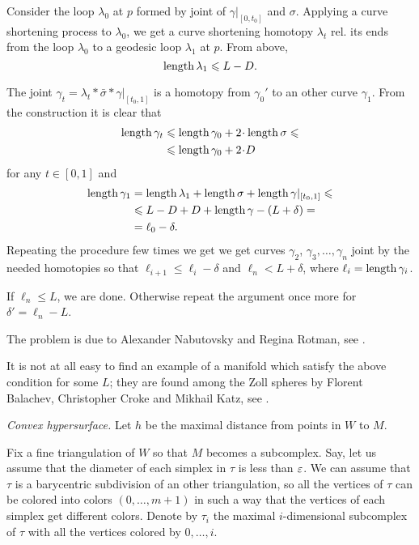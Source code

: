 Consider the loop $\lambda_0$ at $p$
formed by joint of $\gamma|_{[0,t_0]}$ and $\sigma$.
Applying a curve shortening process to $\lambda_0$, 
we get a curve shortening homotopy $\lambda_t$
rel. its ends 
from the loop $\lambda_0$ to a geodesic loop $\lambda_1$ at $p$.
From above, 
\[\operatorname{\rm length}\lambda_1\leqslant L-D.\]

The joint $\gamma_t=\lambda_t*\bar\sigma*\gamma|_{[t_0,1]}$
is a homotopy
from $\gamma_0'$ to an other curve $\gamma_1$.
From the construction it is clear that 
\begin{align*}
 \length \gamma_t&\le \length \gamma_0+2\cdot \length\sigma\le
 \\
 &\le \length \gamma_0+2\cdot D
\end{align*}
for any $t\in[0,1]$
and 
\begin{align*}
 \operatorname{\rm length} \gamma_1&=\operatorname{\rm length}\lambda_1+\operatorname{\rm length}\sigma+\operatorname{\rm length}\gamma|_{[t_0,1]}\leqslant
\\ &\leqslant L-D+D+\operatorname{\rm length}\gamma-(L+\delta)=
\\ &=\ell_0 -\delta.
\end{align*}
Repeating the procedure few times we get we get curves $\gamma_2$, $\gamma_3,\dots,\gamma_n$
joint by the needed homotopies so that 
$\ell_{i+1}\le\ell_i-\delta$ and $\ell_n< L+\delta$,
where $\ell_i=\operatorname{\rm length}\gamma_i$.

If $\ell_n\le L$, we are done.
Otherwise repeat the argument once more for $\delta'=\ell_n-L$.

The problem is due to 
Alexander Nabutovsky 
and Regina Rotman,
see \cite{nabutovsky-rotman}.

It is not at all easy to find an example of a manifold  which satisfy the above condition for some $L$;
they are found among the Zoll spheres
by Florent Balachev, Christopher Croke and Mikhail Katz, 
see \cite{balacheff-croke-katz}.

\textit{Convex hypersurface.}
Let $h$ be the maximal distance from points in $W$ to $M$.

Fix a fine triangulation of $W$ 
so that $M$ becomes a subcomplex.
Say, let us assume that the diameter of each simplex in $\tau$ is less than 
$\varepsilon$.
We can assume that $\tau$ is a barycentric subdivision of an other triangulation, so all the vertices of $\tau$ can be colored into colors $(0,\dots, m+1)$
in such a way that the vertices of each simplex 
get different colors.
Denote by $\tau_i$ the maximal $i$-dimensional subcomplex of $\tau$ 
with all the vertices colored by $0,\dots, i$.

